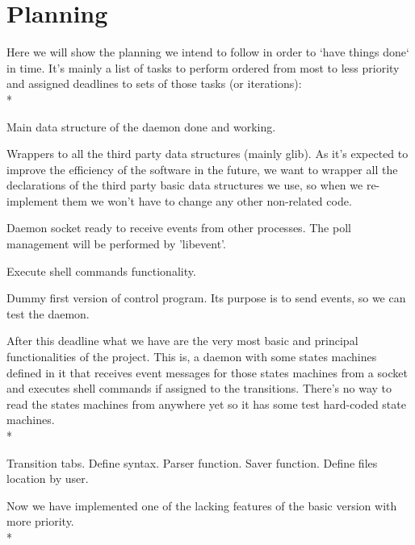 \documentclass[a4paper,11pt]{scrartcl}
\begin{document}
\section{Planning}
Here we will show the planning we intend to follow in order to `have things 
done` in time. It's mainly a list of tasks to perform ordered from most to less 
priority and assigned deadlines to sets of those tasks (or iterations):\\*
\\
\begin{list}{-}{February 16th, 2012}
  \item Main data structure of the daemon done and working.
  \item Wrappers to all the third party data structures (mainly glib).
    \subitem As it's expected to improve the efficiency of the software in the 
	      future, we want to wrapper all the declarations of the third 
	      party basic data structures we use, so when we re-implement them
	      we won't have to change any other non-related code.
  \item Daemon socket ready to receive events from other processes.
    \subitem The poll management will be performed by 'libevent'.
  \item Execute shell commands functionality.
  \item Dummy first version of control program.
    \subitem Its purpose is to send events, so we can test the daemon.
\end{list}
After this deadline what we have are the very most basic and principal 
functionalities of the project. This is, a daemon with some states machines 
defined in it that receives event messages for those states machines from a 
socket and executes shell commands if assigned to the transitions.
There's no way to read the states machines from anywhere yet so it has some test 
hard-coded state machines.\\*
\\
\begin{list}{-}{February 29th, 2012}
  \item Transition tabs. %
    \subitem Define syntax.
    \subitem Parser function.
    \subitem Saver function.
    \subitem Define files location by user.
\end{list}
Now we have implemented one of the lacking features of the basic version with 
more priority.\\*
\\
\end{document}
